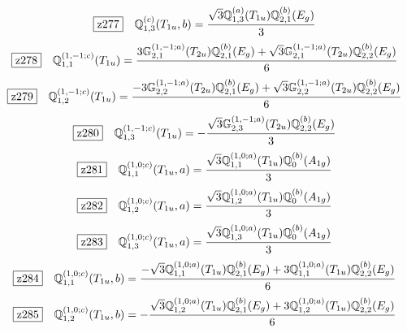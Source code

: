 \documentclass[fleqn,10pt,landscape]{jsarticle}
\begin{document}
\begin{dmath*}
\hspace*{3mm}\fbox{z277}\quad \mathbb{Q}_{1,3}^{(c)}(T_{1u},b)=\frac{\sqrt{3} \mathbb{Q}_{1,3}^{(a)}(T_{1u}) \mathbb{Q}_{2,1}^{(b)}(E_{g})}{3}
\end{dmath*}
\begin{dmath*}
\hspace*{3mm}\fbox{z278}\quad \mathbb{Q}_{1,1}^{(1,-1;c)}(T_{1u})=\frac{3 \mathbb{G}_{2,1}^{(1,-1;a)}(T_{2u}) \mathbb{Q}_{2,1}^{(b)}(E_{g}) + \sqrt{3} \mathbb{G}_{2,1}^{(1,-1;a)}(T_{2u}) \mathbb{Q}_{2,2}^{(b)}(E_{g})}{6}
\end{dmath*}
\begin{dmath*}
\hspace*{3mm}\fbox{z279}\quad \mathbb{Q}_{1,2}^{(1,-1;c)}(T_{1u})=\frac{- 3 \mathbb{G}_{2,2}^{(1,-1;a)}(T_{2u}) \mathbb{Q}_{2,1}^{(b)}(E_{g}) + \sqrt{3} \mathbb{G}_{2,2}^{(1,-1;a)}(T_{2u}) \mathbb{Q}_{2,2}^{(b)}(E_{g})}{6}
\end{dmath*}
\begin{dmath*}
\hspace*{3mm}\fbox{z280}\quad \mathbb{Q}_{1,3}^{(1,-1;c)}(T_{1u})=- \frac{\sqrt{3} \mathbb{G}_{2,3}^{(1,-1;a)}(T_{2u}) \mathbb{Q}_{2,2}^{(b)}(E_{g})}{3}
\end{dmath*}
\begin{dmath*}
\hspace*{3mm}\fbox{z281}\quad \mathbb{Q}_{1,1}^{(1,0;c)}(T_{1u},a)=\frac{\sqrt{3} \mathbb{Q}_{1,1}^{(1,0;a)}(T_{1u}) \mathbb{Q}_{0}^{(b)}(A_{1g})}{3}
\end{dmath*}
\begin{dmath*}
\hspace*{3mm}\fbox{z282}\quad \mathbb{Q}_{1,2}^{(1,0;c)}(T_{1u},a)=\frac{\sqrt{3} \mathbb{Q}_{1,2}^{(1,0;a)}(T_{1u}) \mathbb{Q}_{0}^{(b)}(A_{1g})}{3}
\end{dmath*}
\begin{dmath*}
\hspace*{3mm}\fbox{z283}\quad \mathbb{Q}_{1,3}^{(1,0;c)}(T_{1u},a)=\frac{\sqrt{3} \mathbb{Q}_{1,3}^{(1,0;a)}(T_{1u}) \mathbb{Q}_{0}^{(b)}(A_{1g})}{3}
\end{dmath*}
\begin{dmath*}
\hspace*{3mm}\fbox{z284}\quad \mathbb{Q}_{1,1}^{(1,0;c)}(T_{1u},b)=\frac{- \sqrt{3} \mathbb{Q}_{1,1}^{(1,0;a)}(T_{1u}) \mathbb{Q}_{2,1}^{(b)}(E_{g}) + 3 \mathbb{Q}_{1,1}^{(1,0;a)}(T_{1u}) \mathbb{Q}_{2,2}^{(b)}(E_{g})}{6}
\end{dmath*}
\begin{dmath*}
\hspace*{3mm}\fbox{z285}\quad \mathbb{Q}_{1,2}^{(1,0;c)}(T_{1u},b)=- \frac{\sqrt{3} \mathbb{Q}_{1,2}^{(1,0;a)}(T_{1u}) \mathbb{Q}_{2,1}^{(b)}(E_{g}) + 3 \mathbb{Q}_{1,2}^{(1,0;a)}(T_{1u}) \mathbb{Q}_{2,2}^{(b)}(E_{g})}{6}
\end{dmath*}
\end{document}
